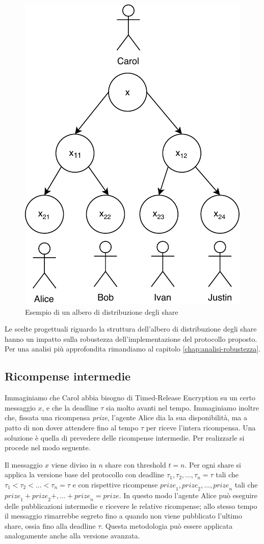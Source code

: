 \begin{figure}[H]
	\centering
	\includegraphics[width=0.45\linewidth]{images/chap_protocollo/protocollo-gerarchia.pdf}
	\caption{Esempio di un albero di distribuzione degli share}
\end{figure}

Le scelte progettuali riguardo la struttura dell'albero di distribuzione degli share hanno un
impatto sulla robustezza dell'implementazione del protocollo proposto. Per una analisi più
approfondita rimandiamo al capitolo \ref{chap:analisi-robustezza}.

\subsection{Ricompense intermedie}
Immaginiamo che Carol abbia bisogno di Timed-Release Encryption su un certo messaggio $ x $, e
che la deadline $ \tau $ sia molto avanti nel tempo.
Immaginiamo inoltre che, fissata una ricompensa \textit{prize},
l'agente Alice dia la sua disponibilità, ma a patto di non dover attendere fino al tempo $ \tau $
per riceve l'intera
ricompensa. Una soluzione è quella di prevedere delle ricompense intermedie. 
Per realizzarle si procede nel modo seguente.

Il messaggio $ x $ viene diviso in $ n $ share con threshold $ t = n $.
Per ogni share si applica la versione base del protocollo
con deadline $ \tau_1, \tau_2, ... , \tau_n = \tau $
tali che $ \tau_1 < \tau_2 < ... < \tau_n = \tau $ e con rispettive ricompense
$ \textit{prize}_1, \textit{prize}_2, ..., \textit{prize}_n $ tali che
$ \textit{prize}_1 + \textit{prize}_2 +, ... + \textit{prize}_n = \textit{prize} $.
In questo modo l'agente Alice può eseguire delle pubblicazioni intermedie e ricevere le relative
ricompense; allo stesso tempo il messaggio rimarrebbe segreto fino a quando non viene pubblicato
l'ultimo share, ossia fino alla deadline $ \tau $.
Questa metodologia può essere applicata analogamente anche alla versione avanzata.
